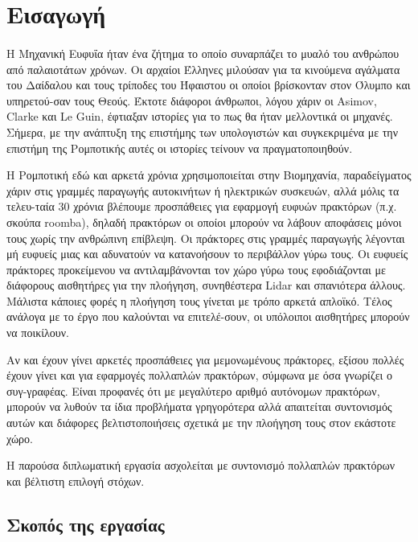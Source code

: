 \section{Εισαγωγή}

\paragraph{}Η Μηχανική Ευφυΐα ήταν ένα ζήτημα το οποίο συναρπάζει το μυαλό του ανθρώπου από παλαιοτάτων χρόνων. Οι αρχαίοι Έλληνες μιλούσαν για τα κινούμενα αγάλματα του Δαίδαλου και τους τρίποδες του Ήφαιστου οι οποίοι βρίσκονταν στον Όλυμπο και υπηρετού-σαν τους Θεούς. Έκτοτε διάφοροι άνθρωποι, λόγου χάριν  οι Asimov, Clarke και Le Guin, έφτιαξαν ιστορίες για το πως θα ήταν μελλοντικά οι μηχανές. Σήμερα, με την ανάπτυξη της επιστήμης των υπολογιστών και συγκεκριμένα με την επιστήμη της Ρομποτικής αυτές οι ιστορίες τείνουν να πραγματοποιηθούν. 

Η Ρομποτική εδώ και αρκετά χρόνια χρησιμοποιείται στην Βιομηχανία, παραδείγματος χάριν στις γραμμές παραγωγής αυτοκινήτων ή ηλεκτρικών συσκευών, αλλά μόλις τα τελευ-ταία 30 χρόνια βλέπουμε προσπάθειες για εφαρμογή ευφυών πρακτόρων (π.χ. σκούπα roomba), δηλαδή πρακτόρων οι οποίοι μπορούν να λάβουν αποφάσεις μόνοι τους χωρίς την ανθρώπινη επίβλεψη. Οι πράκτορες στις γραμμές παραγωγής λέγονται μή ευφυείς μιας και αδυνατούν να κατανοήσουν το περιβάλλον γύρω τους. Οι ευφυείς πράκτορες προκείμενου να αντιλαμβάνονται τον χώρο γύρω τους εφοδιάζονται με διάφορους αισθητήρες για την πλοήγηση, συνηθέστερα Lidar και σπανιότερα άλλους. Μάλιστα κάποιες φορές η πλοήγηση τους γίνεται με τρόπο αρκετά απλοϊκό. Τέλος ανάλογα με το έργο που καλούνται να επιτελέ-σουν, οι υπόλοιποι αισθητήρες μπορούν να ποικίλουν. 

Αν και έχουν γίνει αρκετές προσπάθειες για μεμονωμένους πράκτορες, εξίσου πολλές έχουν γίνει και για εφαρμογές πολλαπλών πρακτόρων, σύμφωνα με όσα γνωρίζει ο συγ-γραφέας. Είναι προφανές ότι με μεγαλύτερο αριθμό αυτόνομων πρακτόρων, μπορούν να λυθούν τα ίδια προβλήματα γρηγορότερα αλλά απαιτείται συντονισμός αυτών και διάφορες βελτιστοποιήσεις σχετικά με την πλοήγηση τους στον εκάστοτε χώρο.

Η παρούσα διπλωματική εργασία ασχολείται με συντονισμό πολλαπλών πρακτόρων και βέλτιστη επιλογή στόχων.  

\subsection{Σκοπός της εργασίας}

